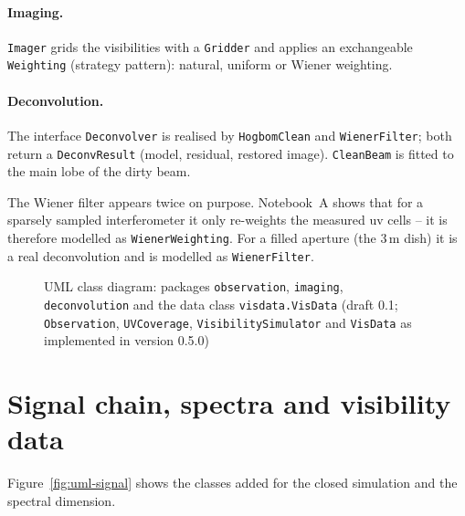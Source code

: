 \paragraph*{Imaging.} \texttt{Imager} grids the visibilities with a
\texttt{Gridder} and applies an exchangeable \texttt{Weighting}
(strategy pattern): natural, uniform or Wiener weighting.

\paragraph*{Deconvolution.} The interface \texttt{Deconvolver} is
realised by \texttt{HogbomClean} and \texttt{WienerFilter}; both return
a \texttt{DeconvResult} (model, residual, restored image).
\texttt{CleanBeam} is fitted to the main lobe of the dirty beam.

The Wiener filter appears twice on purpose. Notebook~A shows that for a
sparsely sampled interferometer it only re-weights the measured uv
cells -- it is therefore modelled as \texttt{WienerWeighting}. For a
filled aperture (the 3\,m dish) it is a real deconvolution and is
modelled as \texttt{WienerFilter}.

\begin{figure}
  \centering
  \resizebox{!}{14cm}{}
  \caption{UML class diagram: packages \texttt{observation},
           \texttt{imaging}, \texttt{deconvolution} and the data class
           \texttt{visdata.VisData} (draft 0.1; \texttt{Observation},
           \texttt{UVCoverage}, \texttt{VisibilitySimulator} and
           \texttt{VisData} as implemented in version 0.5.0)}
  \label{fig:uml-pipeline}
\end{figure}

\section{Signal chain, spectra and visibility data}

Figure~\ref{fig:uml-signal} shows the classes added for the closed
simulation and the spectral dimension.

